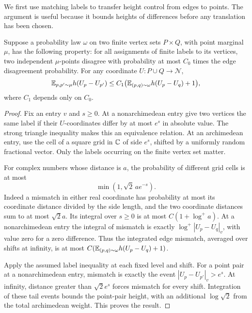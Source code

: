 We first use matching labels to transfer height control from edges to
points. The argument is useful because it bounds heights of differences
before any translation has been chosen.

\begin{lemma}\label{ht:transfer}
Suppose a probability law $\omega$ on two finite vertex sets $P\times Q$,
with point marginal $\mu$, has the following property: for all assignments of finite
labels to its vertices, two independent $\mu$-points disagree with
probability at most $C_0$ times the edge disagreement probability.
For any coordinate $U:P\cup Q\to\mathcal N$,
\[
 \mathbb E_{p,p'\sim\mu}h(U_p-U_{p'})
   \le C_1\bigl(\mathbb E_{(p,q)\sim\omega}h(U_p-U_q)+1\bigr),
\]
where $C_1$ depends only on $C_0$.
\end{lemma}

\begin{proof}
Fix an entry $v$ and $s\ge0$. At a nonarchimedean entry give two vertices
the same label if their $U$-coordinates differ by at most $e^s$ in
absolute value. The strong triangle inequality makes this an equivalence
relation. At an archimedean entry, use the cell of a square grid in
$\mathbb C$ of side $e^s$, shifted by a uniformly random fractional vector.
Only the labels occurring on the finite vertex set matter.

For complex numbers whose distance is $a$, the probability of different
grid cells is at most
\[
 \min(1,\sqrt2\,a e^{-s}).
\]
Indeed a mismatch in either real coordinate has probability at most its
coordinate distance divided by the side length, and the two coordinate
distances sum to at most $\sqrt2 a$. Its integral over $s\ge0$ is at most
$C(1+\log^+ a)$. At a nonarchimedean entry the integral of mismatch is
exactly $\log^+|U_p-U_q|_v$, with value zero for a zero difference.
Thus the integrated edge mismatch, averaged over shifts at infinity,
is at most $C(\mathbb E_{(p,q)\sim\omega}h(U_p-U_q)+1)$.

Apply the assumed label inequality at each fixed level and shift.
For a point pair at a nonarchimedean entry, mismatch is exactly the
event $|U_p-U_{p'}|_v>e^s$. At infinity, distance greater than
$\sqrt2 e^s$ forces mismatch for every shift. Integration of these
tail events bounds the point-pair height, with an additional
$\log\sqrt2$ from the total archimedean weight. This proves the result.
\end{proof}

